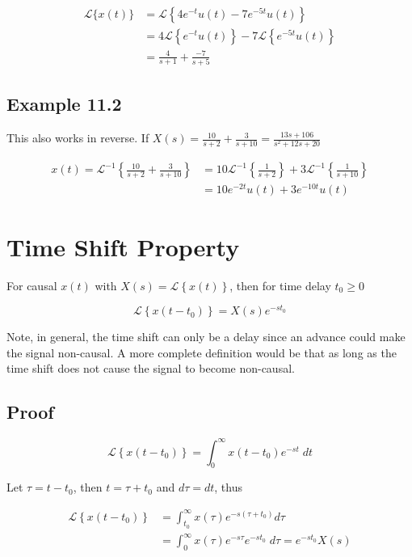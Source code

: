 \documentclass{article}
\begin{document}
$$
\begin{aligned}
\mathcal{L}\{x(t)\} & =\mathcal{L}\left\{4 e^{-t} u(t)-7 e^{-5 t} u(t)\right\} \\
& =4 \mathcal{L}\left\{e^{-t} u(t)\right\}-7\mathcal{L}\left\{e^{-5 t} u(t)\right\} \\
& =\frac{4}{s+1}+\frac{-7}{s+5}
\end{aligned}
$$

\subsection{Example 11.2}

This also works in reverse. If $X(s)=\frac{10}{s+2}+\frac{3}{s+10}=\frac{13 s+106}{s^{2}+12 s+20}$

$$
\begin{aligned}
x(t)=\mathcal{L}^{-1}\left\{\frac{10}{s+2}+\frac{3}{s+10}\right\} & =10 \mathcal{L}^{-1}\left\{\frac{1}{s+2}\right\}+3 \mathcal{L}^{-1}\left\{\frac{1}{s+10}\right\} \\
& =10 e^{-2 t} u(t)+3 e^{-10 t} u(t)
\end{aligned}
$$

\section{Time Shift Property}

For causal $x(t)$ with $X(s) = \mathcal{L}\left\{x(t)\right\}$, then for time delay $t_0 \geq 0$

\[
\mathcal{L}\left\{ x(t-t_0) \right\} = X(s) e^{-s t_0}
\]

Note, in general, the time shift can only be a delay since an advance could make the signal non-causal. A more complete definition would be that as long as the time shift does not cause the signal to become non-causal.

\subsection{Proof}

\[
\mathcal{L}\left\{x\left(t-t_{0}\right)\right\} =\int_{0}^{\infty} x\left(t-t_{0}\right) e^{-s t} \; dt
\]

Let $\tau = t-t_0$, then $t = \tau + t_0$ and $d\tau = dt$, thus

$$
\begin{aligned}
\mathcal{L}\left\{x\left(t-t_{0}\right)\right\} &= \int_{t_{0}}^{\infty} x(\tau) e^{-s\left(\tau+t_{0}\right)} d\tau\\
& =\int_{0}^{\infty} x(\tau) e^{-s \tau} e^{-s t_{0}} \; d\tau = e^{-s t_{0}} X(s)
\end{aligned}
$$
\end{document}
